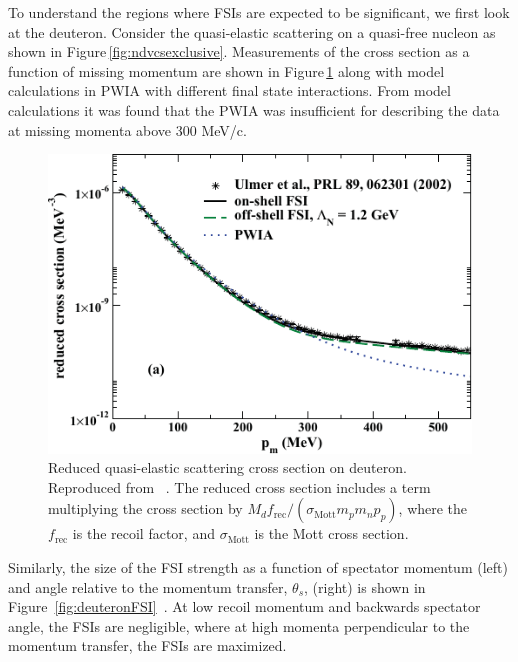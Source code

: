 To understand the regions where FSIs are expected to be significant, we first 
look at the deuteron. Consider the quasi-elastic scattering on a quasi-free 
nucleon as shown in Figure\,\ref{fig:ndvcsexclusive}. Measurements of the  cross section as a 
function of missing momentum are shown in 
Figure\,\ref{fig:quasiElasticDeuteronFSI} along with model calculations in PWIA 
with different final state interactions. From model calculations it was found 
that the PWIA was insufficient for describing the data at missing momenta above 
300 MeV/c.
\begin{figure}
   \centering
   \includegraphics{figures/elastic_deuteron_FSI.pdf}
   \caption{\label{fig:quasiElasticDeuteronFSI}Reduced quasi-elastic scattering 
   cross section  on deuteron. Reproduced from ~\cite{Jeschonnek:2008zg}.  The 
   reduced cross section includes a term multiplying the cross section by $M_d 
   f_{\text{rec}}/(\sigma_{\text{Mott}} m_p m_n p_p)$, where the 
   $f_{\text{rec}}$ is the recoil factor, and $\sigma_{\text{Mott}}$ is the 
   Mott cross section.}
\end{figure}
Similarly, the size of the FSI strength as a function of spectator momentum 
(left) and angle relative to the momentum transfer, $\theta_s$, (right) is 
shown in 
Figure~\ref{fig:deuteronFSI}~\cite{CiofidegliAtti:2003pb,CiofidegliAtti:2002as}.  
At low recoil momentum and backwards spectator angle, the FSIs are negligible, 
where at high momenta perpendicular to the momentum transfer, the FSIs are 
maximized.

